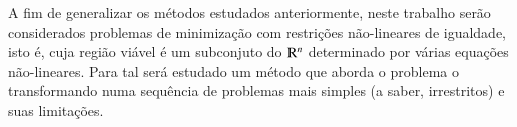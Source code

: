 A fim de generalizar os métodos estudados anteriormente, neste trabalho
serão considerados problemas de minimização com restrições não-lineares de igualdade,
isto é, cuja região viável é um subconjuto do $\varmathbb{R}^n$ determinado por várias
equações não-lineares.
Para tal será estudado um método que aborda o problema o transformando numa
sequência de problemas mais simples (a saber, irrestritos) e suas limitações.
